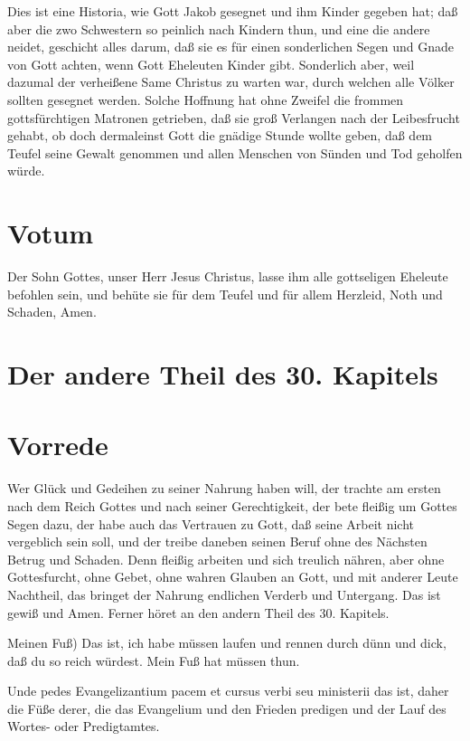 Dies ist eine Historia, wie Gott Jakob gesegnet und ihm Kinder gegeben hat; daß aber die zwo Schwestern so peinlich nach Kindern thun, und eine die andere neidet, geschicht alles darum, daß sie es für einen sonderlichen Segen und Gnade von Gott achten, wenn Gott Eheleuten Kinder gibt. Sonderlich aber, weil dazumal der verheißene Same Christus zu warten war, durch welchen alle Völker sollten gesegnet werden. Solche Hoffnung hat ohne Zweifel die frommen gottsfürchtigen Matronen getrieben, daß sie groß Verlangen nach der Leibesfrucht gehabt, ob doch dermaleinst Gott die gnädige Stunde wollte geben, daß dem Teufel seine Gewalt genommen und allen Menschen von Sünden und Tod geholfen würde.

\section{Votum}

Der Sohn Gottes, unser Herr Jesus Christus, lasse ihm alle gottseligen Eheleute befohlen sein, und behüte sie für dem Teufel und für allem Herzleid, Noth und Schaden, Amen.

\section{Der andere Theil des 30. Kapitels}

\section{Vorrede}

Wer Glück und Gedeihen zu seiner Nahrung haben will, der trachte am ersten nach dem Reich Gottes und nach seiner Gerechtigkeit, der bete fleißig um Gottes Segen dazu, der habe auch das Vertrauen zu Gott, daß seine Arbeit nicht vergeblich sein soll, und der treibe daneben seinen
Beruf ohne des Nächsten Betrug und Schaden. Denn fleißig arbeiten und sich treulich nähren, aber ohne Gottesfurcht, ohne Gebet, ohne wahren Glauben an Gott, und mit anderer Leute Nachtheil, das bringet der Nahrung endlichen Verderb und Untergang. Das ist gewiß und Amen. Ferner höret an den andern Theil des 30. Kapitels.

Meinen Fuß) Das ist, ich habe müssen laufen und rennen durch dünn und dick, daß du so reich würdest. Mein Fuß hat müssen thun.

Unde pedes Evangelizantium pacem et cursus verbi seu ministerii das ist, daher die Füße derer, die das Evangelium und den Frieden predigen und der Lauf des Wortes- oder Predigtamtes.

